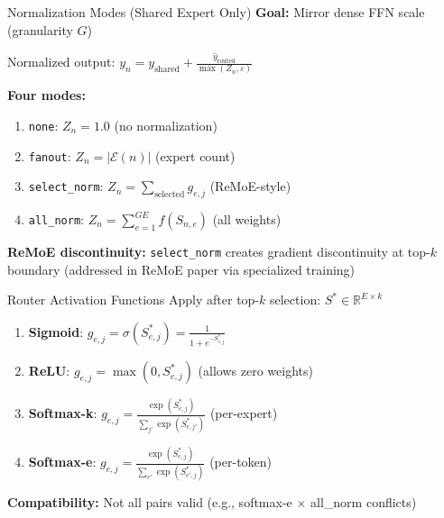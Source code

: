 \documentclass{beamer}
\begin{document}
\begin{frame}{Normalization Modes (Shared Expert Only)}
\textbf{Goal:} Mirror dense FFN scale (granularity $G$)

\vspace{0.3cm}
Normalized output: $y_n = y_{\text{shared}} + \frac{\hat{y}_{\text{routed}}}{\max(Z_n, \varepsilon)}$

\vspace{0.3cm}
\textbf{Four modes:}
\begin{enumerate}
    \item \texttt{none}: $Z_n = 1.0$ (no normalization)
    \item \texttt{fanout}: $Z_n = |\mathcal{E}(n)|$ (expert count)
    \item \texttt{select\_norm}: $Z_n = \sum_{\text{selected}} g_{e,j}$ (ReMoE-style)
    \item \texttt{all\_norm}: $Z_n = \sum_{e=1}^{GE} f(S_{n,e})$ (all weights)
\end{enumerate}

\vspace{0.2cm}
\textbf{ReMoE discontinuity:} \texttt{select\_norm} creates gradient discontinuity at top-$k$ boundary (addressed in ReMoE paper via specialized training)
\end{frame}

\begin{frame}{Router Activation Functions}
Apply after top-$k$ selection: $S^* \in \mathbb{R}^{E \times k}$

\vspace{0.3cm}
\begin{enumerate}
    \item \textbf{Sigmoid}: $g_{e,j} = \sigma(S^*_{e,j}) = \frac{1}{1 + e^{-S^*_{e,j}}}$

    \item \textbf{ReLU}: $g_{e,j} = \max(0, S^*_{e,j})$ (allows zero weights)

    \item \textbf{Softmax-k}: $g_{e,j} = \frac{\exp(S^*_{e,j})}{\sum_{j'} \exp(S^*_{e,j'})}$ (per-expert)

    \item \textbf{Softmax-e}: $g_{e,j} = \frac{\exp(S^*_{e,j})}{\sum_{e'} \exp(S^*_{e',j})}$ (per-token)
\end{enumerate}

\vspace{0.3cm}
\textbf{Compatibility:} Not all pairs valid (e.g., softmax-e $\times$ all\_norm conflicts)
\end{frame}
\end{document}
